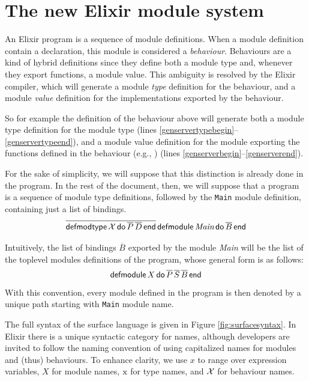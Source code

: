\documentclass[a4paper,10pt]{article}
\begin{document}
\section{The new Elixir module system}
An Elixir program is a sequence of module definitions. When a module definition contain a  declaration, this module is considered a \emph{behaviour}. Behaviours are a kind of hybrid definitions since they define both a module type and, whenever they export functions, a module value. This ambiguity is resolved by the Elixir compiler, which will generate a module \emph{type} definition for the behaviour, and a module \emph{value} definition for the implementations exported by the behaviour.

So for example the definition of the  behaviour above will generate both a module type definition for the module type  (lines \ref{genservertypebegin}--\ref{genservertypeend}), and a module value definition for the module  exporting the functions defined in the behaviour (e.g., ) (lines \ref{genserverbegin}--\ref{genserverend}).

For the sake of simplicity, we will suppose that this distinction is already done in the program. In the rest of the document, then, we will suppose that a program is a sequence of module type definitions, followed by the \texttt{Main} module definition, containing just a list of bindings. 
\[\overline{\operatorname{\textsf{defmodtype}} \mathcal{X} \operatorname{\textsf{do}} \overline{P}\, \overline{D} \operatorname{\textsf{end}}}\operatorname{\textsf{defmodule}} \textit{Main} \operatorname{\textsf{do}} \overline{B} \operatorname{\textsf{end}}\]

Intuitively, the list of bindings $\overline{B}$ exported by the module \textit{Main} will be the list of the toplevel modules definitions of the program, whose general form is as follows: 
\begin{equation}\label{eq:module}
\operatorname{\textsf{defmodule}} X \operatorname{\textsf{do}} \overline{P}\, \overline{S}\, \overline{B} \operatorname{\textsf{end}}
\end{equation}
With this convention, every module defined in the program is then denoted by a unique path starting with \texttt{Main} module name.

The full syntax of the surface language is given in Figure \ref{fig:surfacesyntax}. In Elixir there is a unique syntactic category for names, although developers are invited to follow the naming convention of using capitalized names for modules and (thus) behaviours. To enhance clarity, we use $x$ to range over expression variables, $X$ for module names, $\text{\rm x}$ for type names, and $\mathcal{X}$ for behaviour names. 
\end{document}
